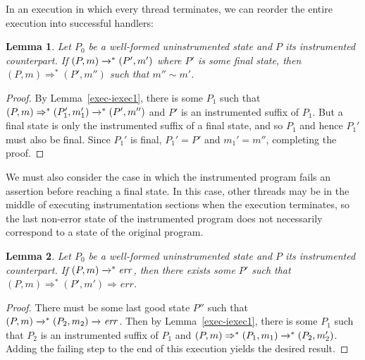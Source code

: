 \documentclass[preprint, 10pt]{sigplanconf}
\newcommand{\cfg}[2]{\ensuremath{(#1, #2)}}
\newcommand{\execstar}[4]{\ensuremath{\cfg{#1}{#2} \tto{#3} #4}}
\newcommand{\execs}[3]{\ensuremath{ \xrightarrow{#2}_{#1} #3}}
\newcommand{\execstars}[2]{\ensuremath{ \tto{#1} #2}}
\newcommand{\iexecs}[2]{\ensuremath{ \Rightarrow_{#1} #2}}
\newcommand{\iexecstar}[3]{\ensuremath{(#1, #2) \Rightarrow^{*} #3}}
\newcommand{\tto}[1]{\mathrel{
  \vphantom{\xrightarrow{#1}}
  \smash{\xrightarrow{#1}}
  \vphantom{\to}^{*}}
}
\newtheorem{lemma}{Lemma}
\begin{document}
In an execution in which every thread terminates, we can reorder the entire execution into successful handlers:
\begin{lemma}\label{exec-iexec}Let $P_0$ be a well-formed uninstrumented state and $P$ its instrumented counterpart. If $\execstar{P}{m}{}{(P', m')}$ where $P'$ is some final state, then $\iexecstar{P}{m}{(P', m'')}$ such that $m'' \sim m'$.\end{lemma}
\begin{proof}By Lemma~\ref{exec-iexec1}, there is some $P_1$ such that $\iexecstar{P}{m}{(P_1', m_1')} \execstars{}{(P', m'')}$ and $P'$ is an instrumented suffix of $P_1$. But a final state is only the instrumented suffix of a final state, and so $P_1$ and hence $P_1'$ must also be final. Since $P_1'$ is final, $P_1' = P'$ and $m_1' = m''$, completing the proof.\end{proof}

We must also consider the case in which the instrumented program fails an assertion before reaching a final state. In this case, other threads may be in the middle of executing instrumentation sections when the execution terminates, so the last non-error state of the instrumented program does not necessarily correspond to a state of the original program.
\begin{lemma}\label{exec-fail-iexec}Let $P_0$ be a well-formed uninstrumented state and $P$ its instrumented counterpart. If $\execstar{P}{m}{}{\mathit{err}}$, then there exists some $P'$ such that $\iexecstar{P}{m}{(P', m')} \iexecs{}{\mathit{err}}$.\end{lemma}
\begin{proof}There must be some last good state $P''$ such that $\execstar{P}{m}{}{(P_2, m_2)} \execs{}{}{\mathit{err}}$. Then by Lemma~\ref{exec-iexec1}, there is some $P_1$ such that $P_2$ is an instrumented suffix of $P_1$ and $\iexecstar{P}{m}{(P_1, m_1)} \execstars{}{(P_2, m_2')}$. Adding the failing step to the end of this execution yields the desired result.\end{proof}
\end{document}

